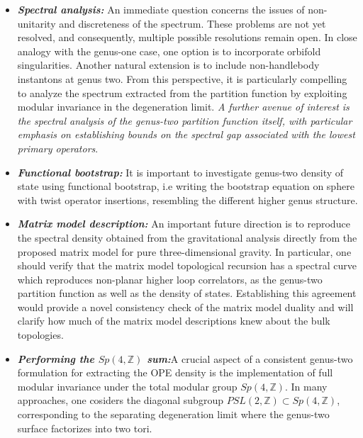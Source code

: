 \documentclass[12 pt]{article}
\begin{document}
\begin{itemize}
\noindent
\textbf{Future Outlooks.}\,\,Below we state some important future directions as follows,
\item\textit{\textbf{Spectral analysis:}} An immediate question concerns the issues of non-unitarity and discreteness of the spectrum. These problems are not yet resolved, and consequently, multiple possible resolutions remain open. In close analogy with the genus-one case, one option is to incorporate orbifold singularities. Another natural extension is to include non-handlebody instantons at genus two. From this perspective, it is particularly compelling to analyze the spectrum extracted from the partition function by exploiting modular invariance in the degeneration limit.
\textit{A further avenue of interest is the spectral analysis of the genus-two partition function itself, with particular emphasis on establishing bounds on the spectral gap associated with the lowest primary operators}.
\item \textit{\textbf{Functional bootstrap:} } It is important to investigate genus-two density of state using functional bootstrap, i.e writing the bootstrap equation on sphere with twist operator insertions, resembling the different higher genus structure.
\item\textit{\textbf{Matrix model description:}} An important future direction is to reproduce the spectral density obtained from the gravitational analysis directly from the proposed matrix model for pure three-dimensional gravity. In particular, one should verify that the matrix model topological recursion has a spectral curve which reproduces non-planar higher loop correlators, as the genus-two partition function as well as the density of states. Establishing this agreement would provide a novel consistency check of the matrix model duality and will clarify how much of the matrix model descriptions knew about the bulk topologies. 

\item \textit{\textbf{Performing the $Sp(4,\mathbb{Z})$ sum:}}A crucial aspect of a consistent genus-two formulation for extracting the OPE density is the implementation of full modular invariance under the total modular group $Sp(4,\mathbb{Z})$. In many approaches, one cosiders the diagonal subgroup $PSL(2,\mathbb{Z})\subset Sp(4,\mathbb{Z})$, corresponding to the separating degeneration limit where the genus-two surface factorizes into two tori.


\end{itemize}
\end{document}
